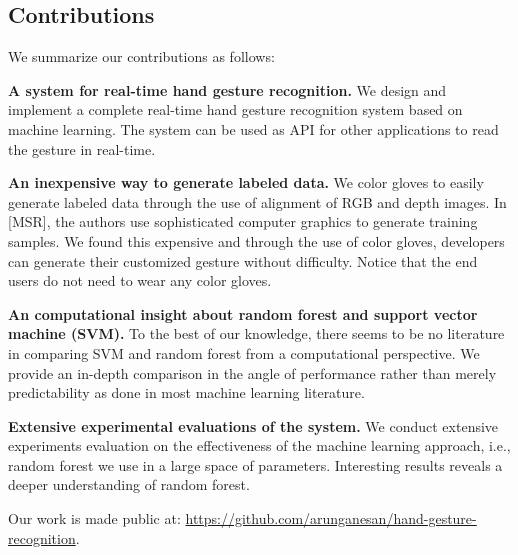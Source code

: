 \subsection{Contributions}

We summarize our contributions as follows:

\textbf{A system for real-time hand gesture recognition.} We design and implement a complete real-time hand gesture recognition system based on machine learning. The system can be used as API for other applications to read the gesture in real-time.

\textbf{An inexpensive way to generate labeled data.} We color gloves to easily generate labeled data through the use of alignment of RGB and depth images. In [MSR], the authors use sophisticated computer graphics to generate training samples. We found this expensive and through the use of color gloves, developers can generate their customized gesture without difficulty. Notice that the end users do not need to wear any color gloves. 

\textbf{An computational insight about random forest and support vector machine (SVM).} To the best of our knowledge, there seems to be no literature in comparing  SVM and random forest from a computational perspective. We provide an in-depth comparison in the angle of performance rather than merely predictability as done in most machine learning literature. 

\textbf{Extensive experimental evaluations of the system.} We conduct extensive experiments evaluation on the effectiveness of the machine learning approach, i.e., random forest we use in a large space of parameters. Interesting results reveals a deeper understanding of random forest. 

Our work is made public at: \url{https://github.com/arunganesan/hand-gesture-recognition}.
